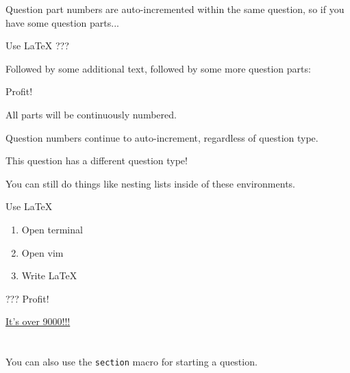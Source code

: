\documentclass[11pt,largemargins]{homework}
\begin{document}
\question
    Question part numbers are auto-incremented within the same question, so if you have some question parts...

    \begin{alphaparts}
        \questionpart
            Use \LaTeX
        \questionpart ???
    \end{alphaparts}

    Followed by some additional text, followed by some more question parts:

    \begin{alphaparts}
        \questionpart Profit!
    \end{alphaparts}

    All parts will be continuously numbered.

\question
  Question numbers continue to auto-increment, regardless of question type.

  \lipsum[4]

\renewcommand{\questiontype}{Task}
\question
  This question has a different question type!

  \lipsum[5]

\renewcommand{\questiontype}{Question}

\question
  You can still do things like nesting lists inside of these environments.
  \begin{alphaparts}
    \questionpart Use \LaTeX
      \begin{enumerate}
        \item Open terminal
        \item Open vim
        \item Write LaTeX
      \end{enumerate}
    \questionpart ???
    \questionpart Profit!
  \end{alphaparts}

  \lipsum[9]

\setcounter{questionCounter}{9000}
\question
  \href{https://www.youtube.com/watch?v=SiMHTK15Pik}{It's over 9000!!!}

  \lipsum[6]


\section{}
  You can also use the \texttt{section} macro for starting a question.
\end{document}
